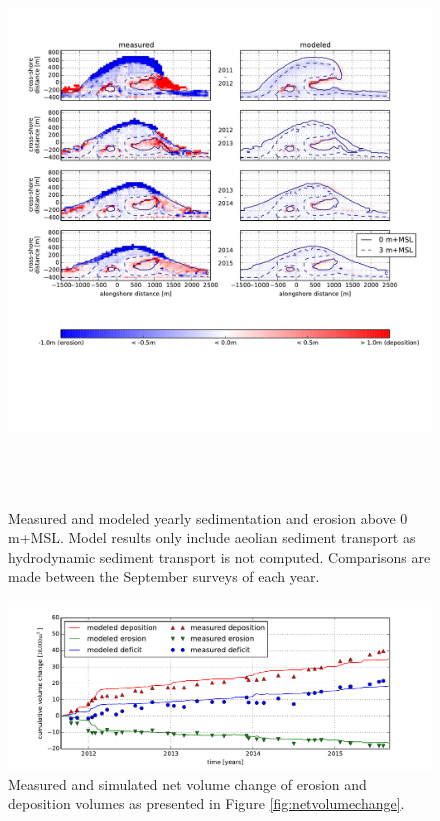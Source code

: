 \begin{figure}
  \centering
  \includegraphics[height=15cm, angle=90]{../Figures/model_sedero}
  \caption{Measured and modeled yearly sedimentation and erosion
    above 0 m+MSL. Model results only include aeolian sediment
    transport as hydrodynamic sediment transport is not
    computed. Comparisons are made between the September surveys of
    each year.}
  \label{fig:sedero_model}
\end{figure}

\begin{figure}
  \centering
\includegraphics[width=\columnwidth]{../Figures/model_volumes_ts}
\caption{Measured and simulated net volume change of erosion and
  deposition volumes as presented in Figure
  \ref{fig:netvolumechange}.}
  \label{fig:netvolumechange_model}
\end{figure}

